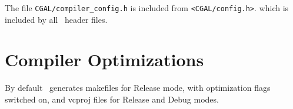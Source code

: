 The file \texttt{CGAL/compiler\_config.h} is included from
\texttt{<CGAL/config.h>}.
which is included by all \cgal\ header files.

\section{Compiler Optimizations\label{sec:compiler-optimisations}}

By default \cmake\ generates makefiles for Release mode, with 
optimization flags switched on, and vcproj files for Release
and Debug modes.




